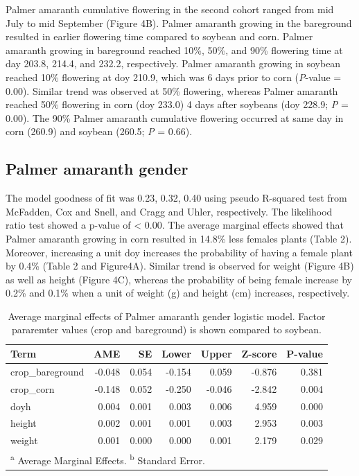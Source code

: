 \documentclass[utf8]{frontiersSCNS}
\begin{document}
Palmer amaranth cumulative flowering in the second cohort ranged from
mid July to mid September (Figure 4B). Palmer amaranth growing in the
bareground resulted in earlier flowering time compared to soybean and
corn. Palmer amaranth growing in bareground reached 10\%, 50\%, and 90\%
flowering time at day 203.8, 214.4, and 232.2, respectively. Palmer
amaranth growing in soybean reached 10\% flowering at doy 210.9, which
was 6 days prior to corn (\emph{P}-value = 0.00). Similar trend was
observed at 50\% flowering, whereas Palmer amaranth reached 50\%
flowering in corn (doy 233.0) 4 days after soybeans (doy 228.9; \emph{P}
= 0.00). The 90\% Palmer amaranth cumulative flowering occurred at same
day in corn (260.9) and soybean (260.5; \emph{P} = 0.66).

\hypertarget{palmer-amaranth-gender}{%
\subsection*{Palmer amaranth gender}\label{palmer-amaranth-gender}}

The model goodness of fit was 0.23, 0.32, 0.40 using pseudo R-squared
test from McFadden, Cox and Snell, and Cragg and Uhler, respectively.
The likelihood ratio test showed a p-value of \textless{} 0.00. The
average marginal effects showed that Palmer amaranth growing in corn
resulted in 14.8\% less females plants (Table 2). Moreover, increasing a
unit doy increases the probability of having a female plant by 0.4\%
(Table 2 and Figure4A). Similar trend is observed for weight (Figure 4B)
as well as height (Figure 4C), whereas the probability of being female
increase by 0.2\% and 0.1\% when a unit of weight (g) and height (cm)
increases, respectively.

\begin{table}[!h]

\caption{\label{tab:unnamed-chunk-3}Average marginal effects of Palmer amaranth gender logistic model. Factor pararemter values (crop and bareground) is shown compared to soybean.}
\centering
\fontsize{10}{12}\selectfont
\begin{tabular}[t]{lrrrrrr}
\toprule
Term & AME & SE & Lower & Upper & Z-score & P-value\\
\midrule
crop\_bareground & -0.048 & 0.054 & -0.154 & 0.059 & -0.876 & 0.381\\

crop\_corn & -0.148 & 0.052 & -0.250 & -0.046 & -2.842 & 0.004\\

doyh & 0.004 & 0.001 & 0.003 & 0.006 & 4.959 & 0.000\\

height & 0.002 & 0.001 & 0.001 & 0.003 & 2.953 & 0.003\\

weight & 0.001 & 0.000 & 0.000 & 0.001 & 2.179 & 0.029\\
\bottomrule
\multicolumn{7}{l}{\rule{0pt}{1em}\textsuperscript{a} Average Marginal Effects. \textsuperscript{b} Standard Error.}\\
\end{tabular}
\end{table}
\end{document}
